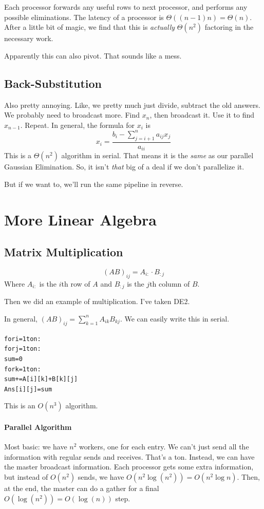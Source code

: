 \documentclass[12pt]{article}
\numberwithin{equation}{section}
\theoremstyle{theorem}
\theoremstyle{definition}
\theoremstyle{remark}
\begin{document}
Each processor forwards any useful rows to next processor, and performs any possible eliminations.  The latency of a processor is $\Theta((n-1)n) = \Theta(n)$.  After a little bit of magic, we find that this is \textit{actually} $\Theta(n^2)$ factoring in the necessary work.

Apparently this can also pivot.  That sounds like a mess.

\subsection{Back-Substitution}
Also pretty annoying.  Like, we pretty much just divide, subtract the old answers.  We probably need to broadcast more.  Find $x_n$, then broadcast it.  Use it to find $x_{n-1}$.  Repeat.  In general, the formula for $x_i$ is
\begin{equation}
x_i = \frac{b_i - \sum_{j=i+1}^n a_{ij}x_j}{a_{ii}}
\end{equation}
This is a $\Theta(n^2)$ algorithm in serial.  That means it is the \textit{same} as our parallel Gaussian Elimination.  So, it isn't \textit{that} big of a deal if we don't parallelize it.

But if we want to, we'll run the same pipeline in reverse.

\section{More Linear Algebra}
\subsection{Matrix Multiplication}
\begin{equation}
(AB)_{ij} = A_{i:}\cdot B_{:j}
\end{equation}
Where $A_{i:}$ is the $i$th row of $A$ and $B_{:j}$ is the $j$th column of $B$.

Then we did an example of multiplication.  I've taken DE2.

In general, $(AB)_{ij} = \sum_{k=1}^n A_{ik}B_{kj}$.  We can easily write this in serial.  
\begin{alltt}
for i = 1 to n:
 for j = 1 to n:
  sum = 0
  for k = 1 to n:
   sum += A[i][k] + B[k][j]
  Ans[i][j] = sum
\end{alltt}
This is an $O(n^3)$ algorithm.  

\paragraph{Parallel Algorithm} Most basic: we have $n^2$ workers, one for each entry.  We can't just send all the information with regular sends and receives. That's a ton.  Instead, we can have the master broadcast information.  Each processor gets some extra information, but instead of $O(n^2)$ sends, we have $O(n^2\log (n^2)) = O(n^2 \log n)$.  Then, at the end, the master can do a gather for a final $O(\log(n^2)) = O(\log(n))$ step.
\end{document}
